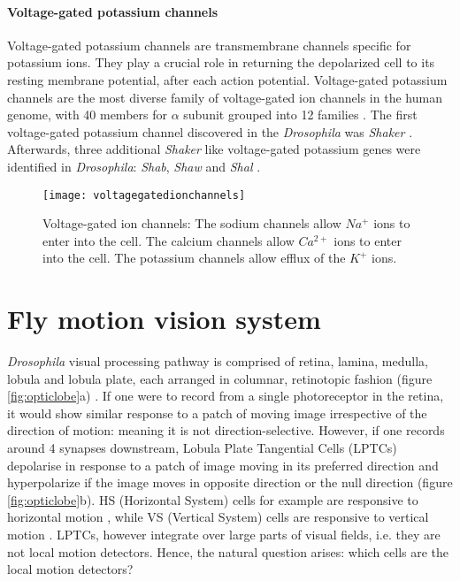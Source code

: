 \paragraph{Voltage-gated potassium channels}
Voltage-gated potassium channels are transmembrane channels specific for potassium ions. They play a crucial role in returning the depolarized cell to its resting membrane potential, after each action potential. Voltage-gated potassium channels are the most diverse family of voltage-gated ion channels in the human genome, with 40 members for $\alpha$ subunit grouped into 12 families \parencite{Gutman2005}. The first voltage-gated potassium channel discovered in the \textit{Drosophila} was \textit{Shaker} \parencite{Papazian1987}. Afterwards, three additional \textit{Shaker} like voltage-gated potassium genes were identified in \textit{Drosophila}: \textit{Shab}, \textit{Shaw} and \textit{Shal} \parencite{Covarrubias1991}. 

\begin{figure}
\centering
\hspace*{-1cm} 
\texttt{[image: voltagegatedionchannels]}
\caption[Voltage-gated ion channels] {Voltage-gated ion channels: The sodium channels allow $Na^{+}$ ions to enter into the cell. The calcium channels allow $Ca^{2+}$ ions to enter into the cell. The potassium channels allow efflux of the $K^{+}$ ions.}
\label{fig:vgatedionc}
\end{figure}


\section{Fly motion vision system}
\textit{Drosophila} visual processing pathway is comprised of retina, lamina, medulla, lobula and lobula plate, each arranged in columnar, retinotopic fashion (figure \ref{fig:opticlobe}a) \parencite{Fischbach1989}. If one were to record from a single photoreceptor in the retina, it would show similar response to a patch of moving image irrespective of the direction of motion: meaning it is not direction-selective. However, if one records around 4 synapses downstream, Lobula Plate Tangential Cells (LPTCs) depolarise in response to a patch of image moving in its preferred direction and hyperpolarize if the image moves in opposite direction or the null direction (figure \ref{fig:opticlobe}b). HS (Horizontal System) cells for example are responsive to horizontal motion \parencite{Schnell2010}, while VS (Vertical System) cells are responsive to vertical motion \parencite{Joesch2008}. LPTCs, however integrate over large parts of visual fields, i.e. they are not local motion detectors. Hence, the natural question arises: which cells are the local motion detectors? 

